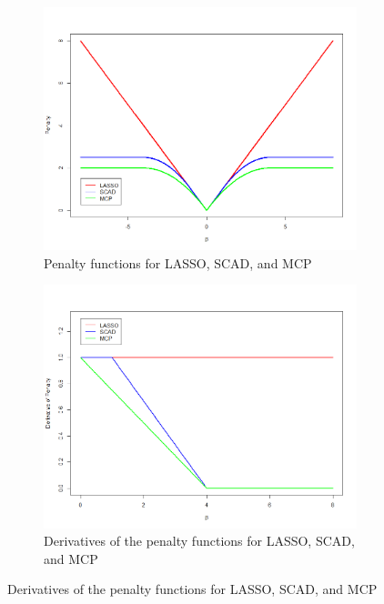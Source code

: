 \documentclass{article}
\begin{document}
\begin{figure}[!h]
	\caption{Penalty functions for LASSO, SCAD, and MCP, as well as their derivatives. These plots use $\lambda = 2$ and $a = 3$.}
	\label{fig:lasso-scad-mcp}
	\centering
	\begin{subfigure}[b]{0.4\textwidth}
		\caption{Penalty functions for LASSO, SCAD, and MCP}
		\label{fig:penalty}
		\includegraphics[width=\textwidth]{images/penalty.png}
	\end{subfigure}
	\hspace{30pt}
	\begin{subfigure}[b]{0.4\textwidth}
		\caption{Derivatives of the penalty functions for LASSO, SCAD, and MCP}
		\label{fig:derivative}
		\includegraphics[width=\textwidth]{images/derivative.png}
	\end{subfigure}
\end{figure}
\end{document}
